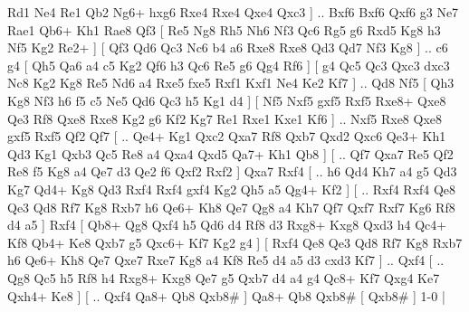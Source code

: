 Rd1 Ne4  Re1 Qb2  Ng6+ hxg6  Rxe4 Rxe4  Qxe4 Qxc3   ] .. Bxf6    Bxf6   Qxf6    g3   Ne7    Rae1   Qb6+    Kh1   Rae8    Qf3 [  Re5 Ng8  Rh5 Nh6  Nf3 Qc6  Rg5 g6  Rxd5 Kg8  h3 Nf5  Kg2 Re2+   ]  [  Qf3 Qd6  Qc3 Nc6  b4 a6  Rxe8 Rxe8  Qd3 Qd7  Nf3 Kg8   ] .. c6    g4 [  Qh5 Qa6  a4 c5  Kg2 Qf6  h3 Qc6  Re5 g6  Qg4 Rf6   ]  [  g4 Qc5  Qc3 Qxc3  dxc3 Nc8  Kg2 Kg8  Re5 Nd6  a4 Rxe5  fxe5 Rxf1  Kxf1 Ne4  Ke2 Kf7   ] .. Qd8    Nf5 [  Qh3 Kg8  Nf3 h6  f5 c5  Ne5 Qd6  Qc3 h5  Kg1 d4   ]  [  Nf5 Nxf5  gxf5 Rxf5  Rxe8+ Qxe8  Qe3 Rf8  Qxe8 Rxe8  Kg2 g6  Kf2 Kg7  Re1 Rxe1  Kxe1 Kf6   ] .. Nxf5    Rxe8   Qxe8    gxf5   Rxf5    Qf2   Qf7 [ .. Qe4+  Kg1 Qxc2  Qxa7 Rf8  Qxb7 Qxd2  Qxc6 Qe3+  Kh1 Qd3  Kg1 Qxb3  Qc5 Re8  a4 Qxa4  Qxd5 Qa7+  Kh1 Qb8   ]  [ .. Qf7  Qxa7 Re5  Qf2 Re8  f5 Kg8  a4 Qe7  d3 Qe2  f6 Qxf2  Rxf2   ]  Qxa7   Rxf4 [ .. h6  Qd4 Kh7  a4 g5  Qd3 Kg7  Qd4+ Kg8  Qd3 Rxf4  Rxf4 gxf4  Kg2 Qh5  a5 Qg4+  Kf2   ]  [ .. Rxf4  Rxf4 Qe8  Qe3 Qd8  Rf7 Kg8  Rxb7 h6  Qe6+ Kh8  Qe7 Qg8  a4 Kh7  Qf7 Qxf7  Rxf7 Kg6  Rf8 d4  a5   ]  Rxf4 [  Qb8+ Qg8  Qxf4 h5  Qd6 d4  Rf8 d3  Rxg8+ Kxg8  Qxd3 h4  Qc4+ Kf8  Qb4+ Ke8  Qxb7 g5  Qxc6+ Kf7  Kg2 g4   ]  [  Rxf4 Qe8  Qe3 Qd8  Rf7 Kg8  Rxb7 h6  Qe6+ Kh8  Qe7 Qxe7  Rxe7 Kg8  a4 Kf8  Re5 d4  a5 d3  cxd3 Kf7   ] .. Qxf4 [ .. Qg8  Qc5 h5  Rf8 h4  Rxg8+ Kxg8  Qe7 g5  Qxb7 d4  a4 g4  Qc8+ Kf7  Qxg4 Ke7  Qxh4+ Ke8   ]  [ .. Qxf4  Qa8+ Qb8  Qxb8#   ]  Qa8+   Qb8    Qxb8#    [  Qxb8#   ] 1-0  |
